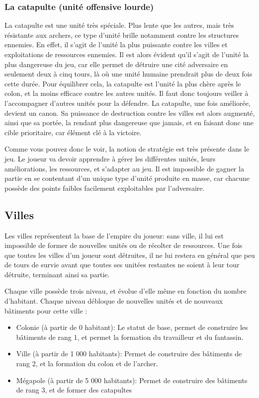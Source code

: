 \documentclass[12pt]{report}
\begin{document}
\subsubsection{La catapulte (unité offensive lourde)}

La catapulte est une unité très spéciale. Plus lente que les autres, mais très
résistante aux archers, ce type d’unité brille notamment contre les structures
ennemies. En effet, il s’agit de l’unité la plus puissante contre les villes et
exploitations de ressources ennemies. Il est alors évident qu’il s’agit de
l’unité la plus dangereuse du jeu, car elle permet de détruire une cité
adversaire en seulement deux à cinq tours, là où une unité humaine prendrait
plus de deux fois cette durée. Pour équilibrer cela, la catapulte est l’unité la
plus chère après le colon, et la moins efficace contre les autres unités. Il
faut donc toujours veiller à l’accompagner d’autres unités pour la défendre. La
catapulte, une fois améliorée, devient un canon. Sa puissance de destruction
contre les villes est alors augmenté, ainsi que sa portée, la rendant plus
dangereuse que jamais, et en faisant donc une cible prioritaire, car élément clé
à la victoire.

Comme vous pouvez donc le voir, la notion de stratégie est très présente dans le
jeu. Le joueur va devoir apprendre à gérer les différentes unités, leurs
améliorations, les ressources, et s’adapter au jeu. Il est impossible de gagner
la partie en se contentant d’un unique type d’unité produite en masse, car
chacune possède des points faibles facilement exploitables par l’adversaire.

\subsection{Villes}

Les villes représentent la base de l’empire du joueur: sans ville, il lui est
impossible de former de nouvelles unités ou de récolter de ressources. Une fois
que toutes les villes d’un joueur sont détruites, il ne lui restera en général
que peu de tours de survie avant que toutes ses unitées restantes ne soient à
leur tour détruite, terminant ainsi sa partie.

Chaque ville possède trois niveau, et évolue d’elle même en fonction du nombre
d’habitant. Chaque niveau débloque de nouvelles unités et de nouveaux bâtiments
pour cette ville :

\begin{itemize}
    \item Colonie (à partir de 0 habitant): Le statut de base, permet de
        construire les bâtiments de rang 1, et permet la formation du
        travailleur et du fantassin.
    \item Ville (à partir de 1 000 habitants): Permet de construire des
        bâtiments de rang 2, et la formation du colon et de l’archer.
    \item Mégapole (à partir de 5 000 habitants): Permet de construire des
        bâtiments de rang 3, et de former des catapultes
\end{itemize}
\end{document}
